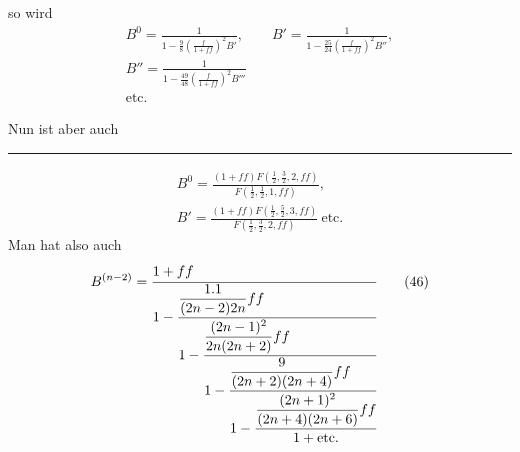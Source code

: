 \noindent so wird
\begin{equation}
\begin{gathered}
B^0=\frac{1}{1-\frac98\left(\frac{f}{1+ff}\right)^2B'},\qquad
B'=\frac{1}{1-\frac{25}{24}\left(\frac{f}{1+ff}\right)^2B''},\\[1.2ex]
B''=\frac{1}{1-\frac{49}{48}\left(\frac{f}{1+ff}\right)^2B'''}\\
\mathrm{etc.}
\end{gathered}\tag*{(45)}
\end{equation}
\noindent {\small [S. 43]}\par
Nun ist aber auch
\par\medskip\noindent\rule{.25\linewidth}{.4pt}\par\smallskip
{\small{}}\par
\clearpage{}
\[
\begin{gathered}
B^0=\frac{(1+ff)F\left(\frac12,\frac32,2,ff\right)}{F\left(\frac12,\frac12,1,ff\right)},\\[1ex]
B'=\frac{(1+ff)F\left(\frac12,\frac52,3,ff\right)}{F\left(\frac12,\frac32,2,ff\right)}\ \mathrm{etc.}
\end{gathered}
\]
\noindent Man hat also auch
\begin{equation}
B^{(n-2)}=\cfrac[l]{1+ff}{1-\cfrac[l]{\dfrac{1{.}1}{(2n-2)2n}ff}
 {1-\cfrac[l]{\dfrac{(2n-1)^2}{2n(2n+2)}ff}
 {1-\cfrac[l]{\dfrac{9}{(2n+2)(2n+4)}ff}
 {1-\cfrac[l]{\dfrac{(2n+1)^2}{(2n+4)(2n+6)}ff}
 {1+\mathrm{etc.}}}}}}
\tag*{(46)}
\end{equation}
\clearpage
\endgroup
